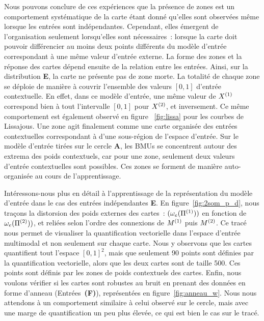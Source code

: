 \documentclass[../main]{subfiles}
\begin{document}
Nous pouvons conclure de ces expériences que la présence de zones est un comportement systématique de la carte étant donné qu'elles sont observées même lorsque les entrées sont indépendantes.
Cependant, elles émergent de l'organisation seulement lorsqu'elles sont nécessaires~: lorsque la carte doit pouvoir différencier au moins deux points différents du modèle  d'entrée correspondant à une même valeur d'entrée externe.
La forme des zones et la réponse des cartes dépend ensuite de la relation entre les entrées.
Ainsi, sur la distribution {\textbf{E}}, la carte ne présente pas de zone morte. 
La totalité de chaque zone se déploie de manière à couvrir l'ensemble des valeurs $[0,1]$ d'entrée contextuelle. En effet, dans ce modèle d'entrée, une même valeur de $X^{({1})}$ correspond bien à tout l'intervalle $[0,1]$ pour $X^{({2})}$, et inversement.
Ce même comportement est également observé en figure ~\ref{fig:lissa} pour les courbes de Lissajous.
Une zone agit finalement comme une carte organisée des entrées contextuelles correspondant à d'une sous-région de l'espace d'entrée. 
Sur le modèle d'entrée tirées sur le cercle \textbf{A}, les BMUs se concentrent autour des extrema des poids contextuels, car pour une zone, seulement deux valeurs d'entrée contextuelles sont possibles.
Ces zones se forment de manière auto-organisée au cours de l'apprentissage.

Intéressons-nous plus en détail à l'apprentissage de la représentation du modèle d'entrée dans le cas des entrées indépendantes \textbf{E}.
En figure~\ref{fig:2som_p_d}, nous traçons la distorsion des poids externes des cartes~: $(\omega_e(\Pi^{({1})}))$ en fonction de  $\omega_e(\Pi^{({2})}))$, et reliées selon l'ordre des connexions de $M^{({1})}$ puis $M^{({2})}$.
Ce tracé nous permet de visualiser la quantification vectorielle dans l'espace d'entrée multimodal et non seulement sur chaque carte. Nous y observons que les cartes quantifient tout l'espace $[0,1]^2$, mais que seulement 90 points sont définies par la quantification vectorielle, alors que les deux cartes sont de taille 500. 
Ces points sont définis par les zones de poids contextuels des cartes.
 Enfin, nous voulons vérifier si les cartes sont robustes au bruit en prenant des données en forme d'anneau (Entrées~\textbf{(F)}), représentées en figure~\ref{fig:anneau_w}. Nous nous attendons à un comportement similaire à celui observé sur le cercle, mais avec une marge de quantification un peu plus élevée, ce qui est bien le cas sur le tracé.
\end{document}
